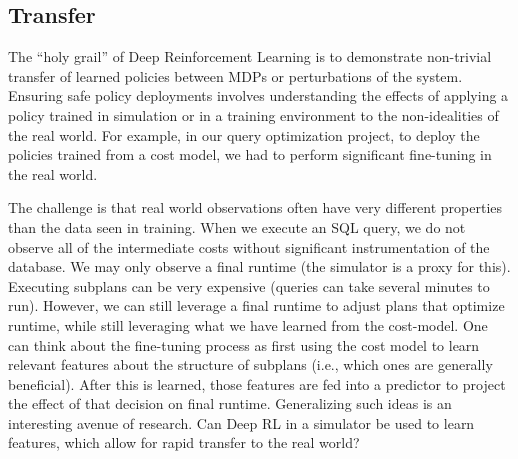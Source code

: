 \subsection*{Transfer}
The ``holy grail'' of Deep Reinforcement Learning is to demonstrate non-trivial transfer of learned policies between MDPs or perturbations of the system. 
Ensuring safe policy deployments involves understanding the effects of applying a policy trained in simulation or in a training environment to the non-idealities of the real world.
For example, in our query optimization project, to deploy the policies trained from a cost model, we had to perform significant fine-tuning in the real world.

The challenge is that real world observations often have very different properties than the data seen in training.
When we execute an SQL query, we do not observe
all of the intermediate costs without significant instrumentation of
the database. We may only observe a final runtime (the simulator is a proxy for this). Executing
subplans can be very expensive (queries can take several minutes
to run). However, we can still leverage a final runtime to adjust
plans that optimize runtime, while still leveraging what we have
learned from the cost-model. One can think about the fine-tuning
process as first using the cost model to learn relevant features about
the structure of subplans (i.e., which ones are generally beneficial).
After this is learned, those features are fed into a predictor to project
the effect of that decision on final runtime.
Generalizing such ideas is an interesting avenue of research. 
Can Deep RL in a simulator be used to learn features, which allow for rapid transfer to the real world?


